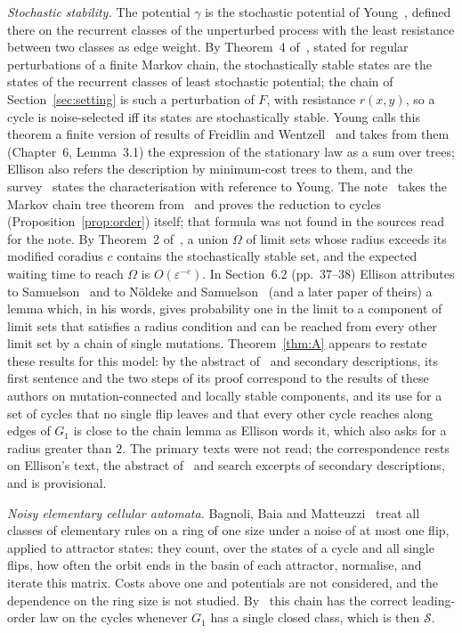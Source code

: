 \documentclass[10pt,a4paper]{article}
\newcommand{\eps}{\varepsilon}
\newcommand{\Sel}{\mathcal{S}}                %
\newcommand{\Gone}{G_1}                       %
\begin{document}
\emph{Stochastic stability.}
The potential $\gamma$ is the stochastic potential of Young~\cite[p.~69]{Young1993}, defined there on the
recurrent classes of the unperturbed process with the least resistance between two classes as edge weight. By
Theorem~4 of~\cite[p.~78]{Young1993}, stated for regular perturbations of a finite Markov chain, the stochastically
stable states are the states of the recurrent classes of least stochastic potential; the chain of
Section~\ref{sec:setting} is such a perturbation of $F$, with resistance $r(x,y)$, so a cycle is noise-selected iff
its states are stochastically stable. Young calls this theorem a finite version of results of Freidlin and
Wentzell~\cite{FreidlinWentzell1984} and takes from them (Chapter~6, Lemma~3.1) the expression of the stationary
law as a sum over trees; Ellison \cite[Section~6.3]{Ellison2000} also refers the description by minimum-cost trees
to them, and the survey~\cite{Newton2018} states the characterisation with reference to Young. The
note~\cite{PeterleinNote} takes the Markov chain tree theorem from~\cite[Theorem~1.1]{PitmanTang2018} and proves
the reduction to cycles (Proposition~\ref{prop:order}) itself; that formula was not found in the sources read for
the note. By Theorem~2 of~\cite[p.~30]{Ellison2000}, a union $\Omega$ of limit sets whose radius exceeds its
modified coradius $c$ contains the stochastically stable set, and the expected waiting time to reach $\Omega$ is
$O(\eps^{-c})$. In Section~6.2 (pp.~37--38) Ellison attributes to Samuelson~\cite{Samuelson1994} and to N\"oldeke
and Samuelson~\cite{NoldekeSamuelson1993} (and a later paper of theirs) a lemma which, in his words, gives
probability one in the limit to a component of limit sets that satisfies a radius condition and can be reached from
every other limit set by a chain of single mutations. Theorem~\ref{thm:A} appears to restate these results for this
model: by the abstract of~\cite{Samuelson1994} and secondary descriptions,
its first sentence and the two steps of its proof correspond to the results of these authors on mutation-connected
and locally stable components, and its use for a set of cycles that no single flip leaves and that every other cycle
reaches along edges of $\Gone$ is close to the chain lemma as Ellison words it, which also asks for a radius greater
than $2$. The primary texts were not read; the correspondence
rests on Ellison's text, the abstract of~\cite{Samuelson1994} and search excerpts of secondary descriptions, and is
provisional.

\emph{Noisy elementary cellular automata.}
Bagnoli, Baia and Matteuzzi~\cite{BagnoliBaiaMatteuzzi2025} treat all classes of elementary rules on a ring of one
size under a noise of at most one flip, applied to attractor states: they count, over the states of a cycle and all
single flips, how often the orbit ends in the basin of each attractor, normalise, and iterate this matrix. Costs
above one and potentials are not considered, and the dependence on the ring size is not studied. By~\cite{PeterleinNote} this chain has
the correct leading-order law on the cycles whenever $\Gone$ has a single closed class, which is then $\Sel$.
\end{document}
